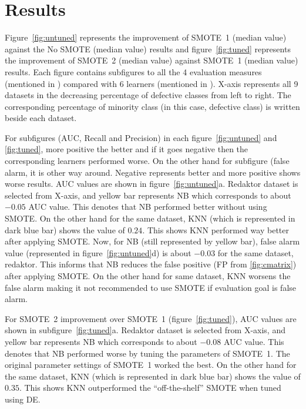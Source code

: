 \section{Results}
\label{sect:results}
Figure~\ref{fig:untuned} represents the improvement of SMOTE~1 (median value) against the No SMOTE (median value) results and figure~\ref{fig:tuned} represents the improvement of SMOTE~2 (median value) against SMOTE~1 (median value) results. Each figure contains subfigures to all the 4 evaluation measures (mentioned in ) compared with 6 learners (mentioned in ). X-axis represents all 9 datasets in the decreasing percentage of defective classes from left to right. The corresponding percentage of minority class (in this case, defective class) is written beside each dataset. 

For subfigures (AUC, Recall and Precision) in each figure~\ref{fig:untuned} and \ref{fig:tuned}, more positive the better and if it goes negative then the corresponding learners performed worse. On the other hand for subfigure (false alarm, it is other way around. Negative represents better and more positive shows worse results. AUC values are shown in figure~\ref{fig:untuned}a. Redaktor dataset is selected from X-axis, and yellow bar represents NB which corresponds to about $-0.05$ AUC value. This denotes that NB performed better without using SMOTE. On the other hand for the same dataset, KNN (which is represented in dark blue bar) shows the value of $0.24$. This shows KNN performed way better after applying SMOTE. Now, for NB (still represented by yellow bar), false alarm value (represented in figure~\ref{fig:untuned}d) is about $-0.03$ for the same dataset, redaktor. This informs that NB reduces the false positive (FP from \ref{fig:cmatrix}) after applying SMOTE. On the other hand for same dataset, KNN worsens the false alarm making it not recommended to use SMOTE if evaluation goal is false alarm.

For SMOTE~2 improvement over SMOTE~1 (figure~\ref{fig:tuned}), AUC values are shown in subfigure~\ref{fig:tuned}a. Redaktor dataset is selected from X-axis, and yellow bar represents NB which corresponds to about $-0.08$ AUC value. This denotes that NB performed worse by tuning the parameters of SMOTE~1. The original parameter settings of SMOTE~1 worked the best. On the other hand for the same dataset, KNN (which is represented in dark blue bar) shows the value of $0.35$. This shows KNN outperformed the ``off-the-shelf'' SMOTE when tuned using DE.

